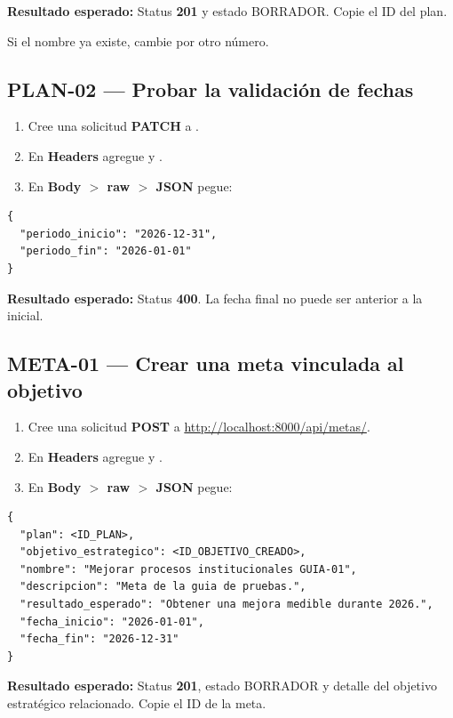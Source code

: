 \documentclass[11pt,a4paper]{article}
\newcommand{\esperado}[1]{\textcolor{VerdeResultado}{\textbf{Resultado esperado:}} #1}
\begin{document}
\esperado{Status \textbf{201} y estado BORRADOR. Copie el ID del plan.}

Si el nombre ya existe, cambie  por otro número.

\subsection{PLAN-02 --- Probar la validación de fechas}

\begin{enumerate}
  \item Cree una solicitud \textbf{PATCH} a .
  \item En \textbf{Headers} agregue  y .
  \item En \textbf{Body $>$ raw $>$ JSON} pegue:
\end{enumerate}

\begin{lstlisting}
{
  "periodo_inicio": "2026-12-31",
  "periodo_fin": "2026-01-01"
}
\end{lstlisting}

\esperado{Status \textbf{400}. La fecha final no puede ser anterior a la inicial.}

\subsection{META-01 --- Crear una meta vinculada al objetivo}

\begin{enumerate}
  \item Cree una solicitud \textbf{POST} a \url{http://localhost:8000/api/metas/}.
  \item En \textbf{Headers} agregue  y .
  \item En \textbf{Body $>$ raw $>$ JSON} pegue:
\end{enumerate}

\begin{lstlisting}
{
  "plan": <ID_PLAN>,
  "objetivo_estrategico": <ID_OBJETIVO_CREADO>,
  "nombre": "Mejorar procesos institucionales GUIA-01",
  "descripcion": "Meta de la guia de pruebas.",
  "resultado_esperado": "Obtener una mejora medible durante 2026.",
  "fecha_inicio": "2026-01-01",
  "fecha_fin": "2026-12-31"
}
\end{lstlisting}

\esperado{Status \textbf{201}, estado BORRADOR y detalle del objetivo estratégico relacionado. Copie el ID de la meta.}
\end{document}
